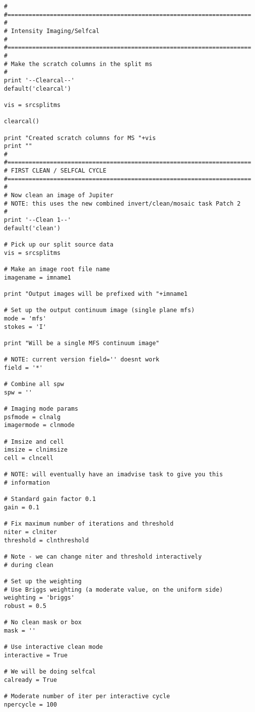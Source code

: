 \begin{verbatim}
#
#=====================================================================
#
# Intensity Imaging/Selfcal
#
#=====================================================================
#
# Make the scratch columns in the split ms
#
print '--Clearcal--'
default('clearcal')

vis = srcsplitms

clearcal()

print "Created scratch columns for MS "+vis
print ""
#
#=====================================================================
# FIRST CLEAN / SELFCAL CYCLE
#=====================================================================
#
# Now clean an image of Jupiter
# NOTE: this uses the new combined invert/clean/mosaic task Patch 2
#
print '--Clean 1--'
default('clean')

# Pick up our split source data
vis = srcsplitms

# Make an image root file name
imagename = imname1

print "Output images will be prefixed with "+imname1

# Set up the output continuum image (single plane mfs)
mode = 'mfs'
stokes = 'I'

print "Will be a single MFS continuum image"

# NOTE: current version field='' doesnt work
field = '*'

# Combine all spw
spw = ''

# Imaging mode params
psfmode = clnalg
imagermode = clnmode

# Imsize and cell
imsize = clnimsize
cell = clncell

# NOTE: will eventually have an imadvise task to give you this
# information

# Standard gain factor 0.1
gain = 0.1

# Fix maximum number of iterations and threshold
niter = clniter
threshold = clnthreshold

# Note - we can change niter and threshold interactively
# during clean

# Set up the weighting
# Use Briggs weighting (a moderate value, on the uniform side)
weighting = 'briggs'
robust = 0.5

# No clean mask or box
mask = ''

# Use interactive clean mode
interactive = True

# We will be doing selfcal
calready = True

# Moderate number of iter per interactive cycle
npercycle = 100


\end{verbatim}
